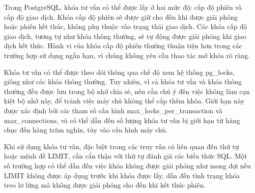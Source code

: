 \begin{enumerate}
    \hspace{1cm}Trong PostgreSQL, khóa tư vấn có thể được lấy ở hai mức độ: cấp độ phiên và cấp độ giao dịch. Khóa cấp độ phiên sẽ được giữ cho đến khi được giải phóng hoặc phiên kết thúc, không phụ thuộc vào trạng thái giao dịch. Các khóa cấp độ giao dịch, tương tự như khóa thông thường, sẽ tự động được giải phóng khi giao dịch kết thúc. Hành vi của khóa cấp độ phiên thường thuận tiện hơn trong các trường hợp sử dụng ngắn hạn, vì chúng không yêu cầu thao tác mở khóa rõ ràng.

    \hspace{1cm}Khóa tư vấn có thể được theo dõi thông qua chế độ xem hệ thống pg\_locks, giống như các khóa thông thường. Tuy nhiên, vì cả khóa tư vấn và khóa thông thường đều được lưu trong bộ nhớ chia sẻ, nên cần chú ý đến việc không làm cạn kiệt bộ nhớ này, để tránh việc máy chủ không thể cấp thêm khóa. Giới hạn này được xác định bởi các tham số cấu hình max\_locks\_per\_transaction và max\_connections, và có thể dẫn đến số lượng khóa tư vấn bị giới hạn từ hàng chục đến hàng trăm nghìn, tùy vào cấu hình máy chủ.

    \hspace{1cm}Khi sử dụng khóa tư vấn, đặc biệt trong các truy vấn có liên quan đến thứ tự hoặc mệnh đề LIMIT, cần cẩn thận với thứ tự đánh giá các biểu thức SQL. Một số trường hợp có thể dẫn đến việc khóa không được giải phóng như mong đợi nếu LIMIT không được áp dụng trước khi khóa được lấy, dẫn đến tình trạng khóa treo lơ lửng mà không được giải phóng cho đến khi kết thúc phiên.
\end{enumerate}


